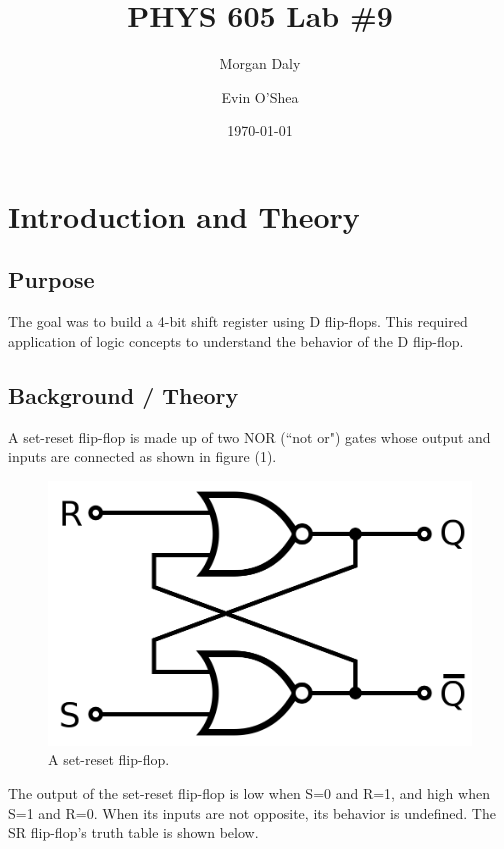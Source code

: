 \documentclass[twocolumn, amsmath]{revtex4}
\begin{document}
\title{PHYS 605 Lab \#9} 

\author{Morgan Daly}
\author{Evin O'Shea}
\date{\today} 


\maketitle


\section{Introduction and Theory}
\subsection{Purpose}

The goal was to build a 4-bit shift register using D flip-flops. This required application of logic concepts to understand the behavior of the D flip-flop.


\subsection{Background / Theory}

A set-reset flip-flop is made up of two NOR (``not or") gates whose output and inputs are connected as shown in figure (1).

\begin{figure}[h]
    \includegraphics[scale=0.18]{setreset}  
    \caption{A set-reset flip-flop.}
\end{figure}

The output of the set-reset flip-flop is low when S=0 and R=1, and high when S=1 and R=0. When its inputs are not opposite, its behavior is undefined. The SR flip-flop's truth table is shown below.
\end{document}
